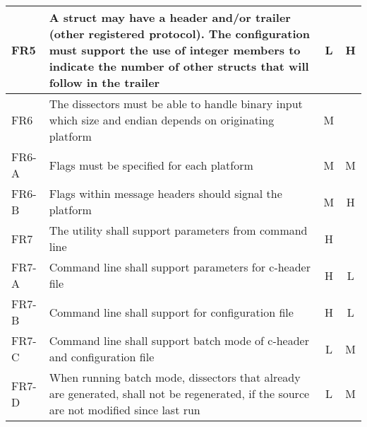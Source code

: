 \begin{table}[ht]
{\begin{tabularx}{1.2\textwidth}{l X c c}
	\midrule
	FR5 & A struct may have a header and/or trailer (other registered protocol). The configuration must support the use of integer members to indicate the number of other structs that will follow in the trailer & L & H \\
	\midrule
	FR6 & The dissectors must be able to handle binary input which size and endian depends on originating platform & M & \\
	FR6-A & Flags must be specified for each platform & M & M \\
	FR6-B & Flags within message headers should signal the platform & M & H \\
	\midrule
	FR7 & The utility shall support parameters from command line & H & \\
	FR7-A & Command line shall support parameters for c-header file & H & L \\
	FR7-B & Command line shall support for configuration file & H & L \\
	FR7-C & Command line shall support batch mode of c-header and configuration file & L & M \\
	FR7-D & When running batch mode, dissectors that already are generated, shall not be regenerated, if the source are not modified since last run & L & M \\
	\bottomrule
\end{tabularx}}
\end{table}

